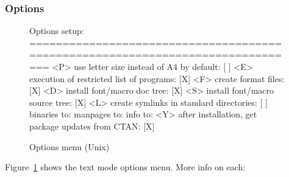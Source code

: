 \documentclass{article}
\begin{document}
\subsubsection{Options}
\label{sec:options}

\begin{figure}[tbh]
\begin{boxedverbatim}
Options setup:
===============================================================================
 <P> use letter size instead of A4 by default: [ ]
 <E> execution of restricted list of programs: [X]
 <F> create format files:                      [X]
 <D> install font/macro doc tree:              [X]
 <S> install font/macro source tree:           [X]
 <L> create symlinks in standard directories:  [ ]
            binaries to:
            manpages to:
                info to:
 <Y> after installation, get package updates from CTAN: [X]
\end{boxedverbatim}
\caption{Options menu (Unix)}\label{fig:options-text}
\end{figure}

Figure~\ref{fig:options-text} shows the text mode options menu.
More info on each:
\end{document}
